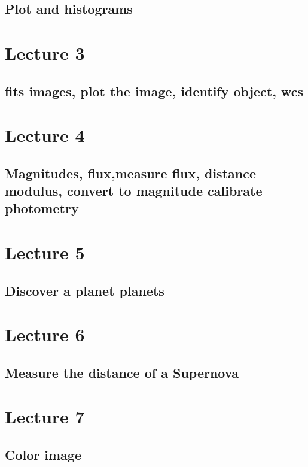 \documentclass[11pt]{book}
\begin{document}
\section{Plot and histograms}



\chapter{Lecture 3}
\section{fits images, plot the image, identify object, wcs}



\chapter{Lecture 4}
\section{Magnitudes, flux,measure flux,  distance modulus, convert to magnitude calibrate photometry}


\chapter{Lecture 5}
\section{Discover a planet planets}

\chapter{Lecture 6}
\section{Measure the distance of a Supernova}

\chapter{Lecture 7}
\section{Color image}








\end{document}
